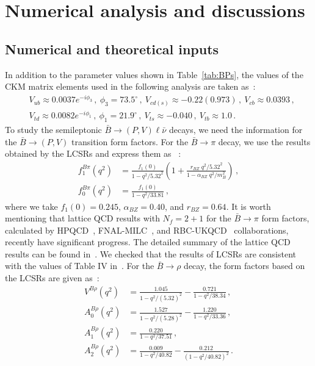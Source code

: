 \documentclass[prd,preprint,superscriptaddress,amsmath,amssymb]{revtex4}
\begin{document}
  \section{Numerical analysis and discussions}
  
  \subsection{Numerical and theoretical inputs}
  
  In addition to the parameter values shown in Table~\ref{tab:BPs}, the  values of the CKM matrix elements used in the following analysis are taken as~\cite{Amhis:2016xyh}:
   \begin{align}
   &V_{ub} \approx 0.0037 e^{-i \phi_3}\,, \ \phi_3=73.5^\circ\,, \ V_{cd(s)}\approx -0.22 (0.973)\,, \  V_{cb} \approx 0.0393 \,,  \nonumber \\
   & V_{td} \approx 0.0082  e^{-i \phi_1 }\,, \ \phi_1=21.9^\circ\,, \ V_{ts} \approx -0.040\,, \ V_{tb} \approx 1.0\,.
   \end{align}
    To study the semileptonic $\bar B \to ( P ,V) \ell \bar \nu$ decays,  we need the information for the $\bar B \to ( P, V)$ transition form factors. For the $\bar B \to \pi$ decay, we use the results obtained by the LCSRs and express them as ~\cite{Ball:2004ye,Ball:2006jz}:
  \begin{align}
  f^{B\pi}_1(q^2) &=\frac{ f_1(0) }{1-q^2/5.32^2 } \left( 1 + \frac{r_{BZ}\; q^2/5.32^2}{1 - \alpha_{BZ} \; q^2/m^2_B} \right)\,,
  \nonumber \\
  f^{B\pi}_0(q^2) & =  \frac{f_1(0)}{1 -q^2 /33.81}\,,
  \end{align}
  where we take $f_1(0)=0.245$, $\alpha_{BZ}=0.40$, and $r_{BZ}=0.64$.  It is worth mentioning that lattice QCD results with $N_f=2+1$ for the $\bar B\to \pi$ form factors, calculated by HPQCD~\cite{Dalgic:2006dt}, FNAL-MILC~\cite{Lattice:2015tia}, and RBC-UKQCD~\cite{Flynn:2015mha} collaborations, recently have  significant progress. The detailed summary of the lattice QCD results can be found in~\cite{Aoki:2016frl}. We checked that the results of LCSRs are consistent with the values of Table IV in~\cite{Flynn:2015mha}.  For the $\bar B\to \rho$ decay, the form factors based on the LCSRs are given as~\cite{Ball:2004rg}:
  \begin{align}
  V^{B\rho}(q^2) & = \frac{1.045}{1- q^2/(5.32)^2} - \frac{0.721}{1- q^2/38.34}\,, \nonumber \\
  A^{B\rho}_0(q^2) & =\frac{1.527}{1-q^2/(5.28)^2} - \frac{1.220}{1- q^2/33.36} \,, \nonumber \\
  A^{B\rho}_1(q^2) & = \frac{0.220}{1 - q^2/37.51} \,, \nonumber \\
  A^{B\rho}_2(q^2) & = \frac{0.009}{1-q^2/40.82} - \frac{0.212}{(1-q^2/40.82 )^2}   \,.
  \end{align}
  
\end{document}
